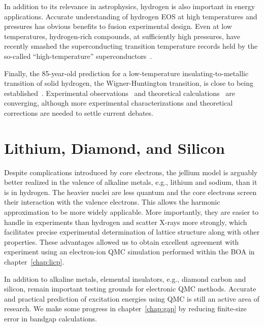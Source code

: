 In addition to its relevance in astrophysics, hydrogen is also important in energy applications. Accurate understanding of hydrogen EOS at high temperatures and pressures has obvious benefits to fusion experimental design.
Even at low temperatures, hydrogen-rich compounds, at sufficiently high pressures, have recently smashed the superconducting transition temperature records held by the so-called ``high-temperature'' superconductors~\cite{Drozdov2015,Errea2020}.

Finally, the 85-year-old prediction for a low-temperature insulating-to-metallic transition of solid hydrogen, the Wigner-Huntington transition, is close to being established~\cite{Wigner1935,Dias2016,Loubeyre2020}.
Experimental observations~\cite{Dias2016,Loubeyre2020} and theoretical calculations~\cite{McMinis2015,Gorelov2019} are converging, although more experimental characterizations and theoretical corrections are needed to settle current debates.


\section{Lithium, Diamond, and Silicon}
Despite complications introduced by core electrons, the jellium model is arguably better realized in the valence of alkaline metals, e.g., lithium and sodium, than it is in hydrogen.
The heavier nuclei are less quantum and the core electrons screen their interaction with the valence electrons.
This allows the harmonic approximation to be more widely applicable.
More importantly, they are easier to handle in experiments than hydrogen and scatter X-rays more strongly, which facilitates precise experimental determination of lattice structure along with other properties.
These advantages allowed us to obtain excellent agreement with experiment using an electron-ion QMC simulation performed within the BOA in chapter~\ref{chap:licp}.

In addition to alkaline metals, elemental insulators, e.g., diamond carbon and silicon, remain important testing grounds for electronic QMC methods. Accurate and practical prediction of excitation energies using QMC is still an active area of research. We make some progress in chapter~\ref{chap:gap} by reducing finite-size error in bandgap calculations.

